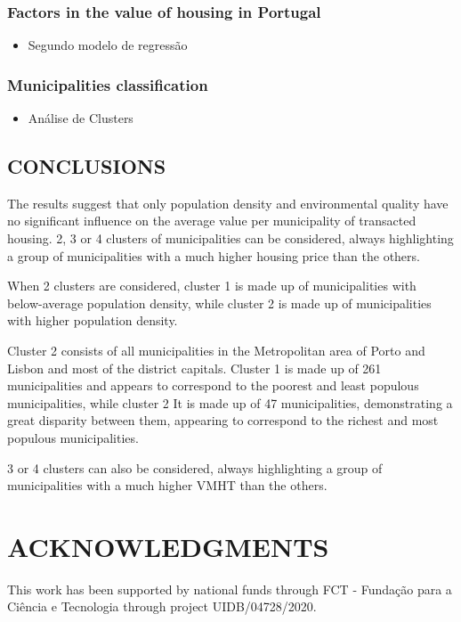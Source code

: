 \documentclass{aip-cp}
\begin{document}
\subsubsection{Factors in
the value of housing in Portugal}

\begin{itemize}
    \item Segundo modelo de regressão
\end{itemize}



\subsubsection{Municipalities classification
}

\begin{itemize}
    \item Análise de Clusters
\end{itemize}


\subsection{\uppercase{Conclusions}}

The results suggest that only population density and environmental quality have no significant influence on the average value per municipality of transacted housing. 2, 3 or 4 clusters of municipalities can be considered, always highlighting a group of municipalities with a much higher housing price than the others.

When 2 clusters are considered, cluster 1 is made up of municipalities with below-average population density, while cluster 2 is made up of municipalities with higher population density.

Cluster 2 consists of all municipalities in the Metropolitan area of Porto and Lisbon and most of the district capitals. 
Cluster 1 is made up of 261 municipalities and appears to correspond to the poorest and least populous municipalities, while cluster 2 It is made up of 47 municipalities, demonstrating a great disparity between them, appearing to correspond to the richest and most populous municipalities.

3 or 4 clusters can also be considered, always highlighting a group of municipalities with a much higher VMHT than the others.

\section{ACKNOWLEDGMENTS}
This work has been supported by national funds through FCT - Fundação para a Ciência e Tecnologia through project UIDB/04728/2020.


\nocite{*}
%
%
\end{document}
